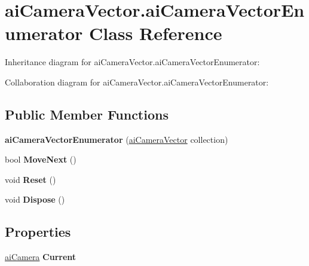 \hypertarget{classai_camera_vector_1_1ai_camera_vector_enumerator}{\section{ai\+Camera\+Vector.\+ai\+Camera\+Vector\+Enumerator Class Reference}
\label{classai_camera_vector_1_1ai_camera_vector_enumerator}
}


Inheritance diagram for ai\+Camera\+Vector.\+ai\+Camera\+Vector\+Enumerator\+:


Collaboration diagram for ai\+Camera\+Vector.\+ai\+Camera\+Vector\+Enumerator\+:
\subsection*{Public Member Functions}
\begin{DoxyCompactItemize}
\item 
\hypertarget{classai_camera_vector_1_1ai_camera_vector_enumerator_a513ec7780b7151391d27bc1b3105159a}{{\bfseries ai\+Camera\+Vector\+Enumerator} (\hyperlink{classai_camera_vector}{ai\+Camera\+Vector} collection)}\label{classai_camera_vector_1_1ai_camera_vector_enumerator_a513ec7780b7151391d27bc1b3105159a}

\item 
\hypertarget{classai_camera_vector_1_1ai_camera_vector_enumerator_a826e45a259e1f86ea6ab798fdfb056e0}{bool {\bfseries Move\+Next} ()}\label{classai_camera_vector_1_1ai_camera_vector_enumerator_a826e45a259e1f86ea6ab798fdfb056e0}

\item 
\hypertarget{classai_camera_vector_1_1ai_camera_vector_enumerator_a7f7e3f96972542fa973509c64e2d9597}{void {\bfseries Reset} ()}\label{classai_camera_vector_1_1ai_camera_vector_enumerator_a7f7e3f96972542fa973509c64e2d9597}

\item 
\hypertarget{classai_camera_vector_1_1ai_camera_vector_enumerator_a1fdfe6c9b0eac3af235b5ce6b45006f0}{void {\bfseries Dispose} ()}\label{classai_camera_vector_1_1ai_camera_vector_enumerator_a1fdfe6c9b0eac3af235b5ce6b45006f0}

\end{DoxyCompactItemize}
\subsection*{Properties}
\begin{DoxyCompactItemize}
\item 
\hypertarget{classai_camera_vector_1_1ai_camera_vector_enumerator_a9d9910a9e73dc4230e12b7e5f01ce07c}{\hyperlink{structai_camera}{ai\+Camera} {\bfseries Current}}\label{classai_camera_vector_1_1ai_camera_vector_enumerator_a9d9910a9e73dc4230e12b7e5f01ce07c}

\end{DoxyCompactItemize}


